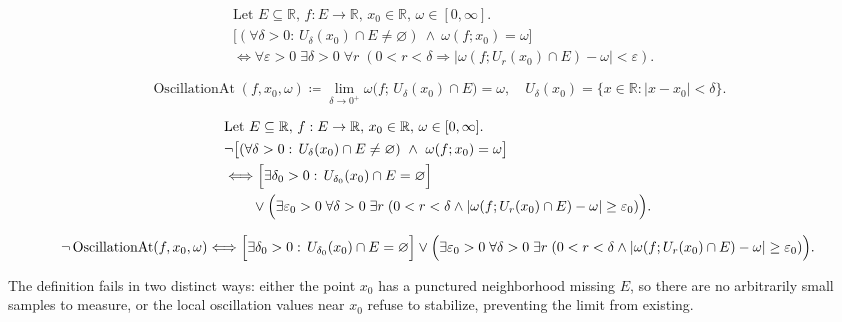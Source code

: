 \begin{remark*}
\[
\begin{aligned}
&\text{Let } E \subseteq \mathbb{R},\, f:E \to \mathbb{R},\, x_0 \in \mathbb{R},\, \omega \in [0,\infty].\\
&\bigl[(\forall \delta>0:\, U_\delta(x_0)\cap E \neq \varnothing)\ \land\ \omega(f;x_0)=\omega\bigr]\\
&\Longleftrightarrow
\forall \varepsilon>0\; \exists \delta>0\; \forall r\;(0<r<\delta \Rightarrow |\omega(f;U_r(x_0)\cap E)-\omega|<\varepsilon).
\end{aligned}
\]
\end{remark*}

\begin{remark*}
\[
\operatorname{OscillationAt}(f,x_0,\omega) \coloneqq
\lim_{\delta \to 0^+} \omega\bigl(f;\,U_\delta(x_0)\cap E\bigr) = \omega,
\quad U_\delta(x_0)=\{x \in \mathbb{R}: |x-x_0|<\delta\}.
\]
\end{remark*}

\begin{remark*}
\[
\begin{aligned}
&\text{Let } E \subseteq \mathbb{R},\, f:E \to \mathbb{R},\, x_0 \in \mathbb{R},\, \omega \in [0,\infty].\\
&\neg\bigl[(\forall \delta>0:\, U_\delta(x_0)\cap E \neq \varnothing)\ \land\ \omega(f;x_0)=\omega\bigr]\\
&\Longleftrightarrow
\Bigl[\exists \delta_0>0:\, U_{\delta_0}(x_0)\cap E = \varnothing\Bigr]\\
&\qquad\lor
\Bigl(\exists \varepsilon_0>0\; \forall \delta>0\; \exists r\;(0<r<\delta \land |\omega(f;U_r(x_0)\cap E)-\omega| \ge \varepsilon_0)\Bigr).
\end{aligned}
\]
\end{remark*}

\begin{remark*}
\[
\neg\operatorname{OscillationAt}(f,x_0,\omega)
\Longleftrightarrow
\Bigl[\exists \delta_0>0:\, U_{\delta_0}(x_0)\cap E = \varnothing\Bigr]
\lor
\Bigl(\exists \varepsilon_0>0\; \forall \delta>0\; \exists r\;(0<r<\delta \land |\omega(f;U_r(x_0)\cap E)-\omega| \ge \varepsilon_0)\Bigr).
\]
\end{remark*}

\begin{remark*}
The definition fails in two distinct ways: either the point $x_0$ has a punctured neighborhood missing $E$, so there are no arbitrarily small samples to measure, or the local oscillation values near $x_0$ refuse to stabilize, preventing the limit from existing.
\end{remark*}

